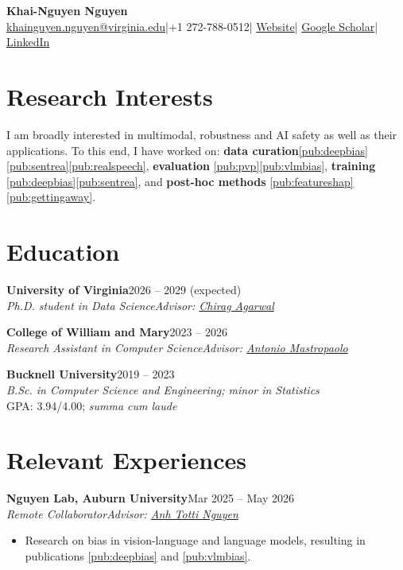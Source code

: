 \documentclass[11pt,a4paper]{article}
\newcommand{\role}[4]{\textbf{#1}\hfill #2\\\textit{#3}\hfill\textit{#4}\par}
\begin{document}
\begin{center}
{\fontsize{23}{23}\selectfont\textbf{Khai-Nguyen Nguyen}}\\[4pt]
\href{mailto:khainguyen.nguyen@virginia.edu}{khainguyen.nguyen@virginia.edu}\enspace|\enspace +1 272-788-0512\enspace|\enspace
\href{https://nkn002.github.io}{Website}\enspace|\enspace
\href{https://scholar.google.com/citations?user=WRiVlZsAAAAJ}{Google Scholar}\enspace|\enspace
\href{https://www.linkedin.com/in/nkn002/}{LinkedIn}
\end{center}

\section{Research Interests}
I am broadly interested in multimodal, robustness and AI safety as well as their applications. To this end, I have worked on: \textbf{data curation}\ref{pub:deepbias}\ref{pub:sentrea}\ref{pub:realspeech}, \textbf{evaluation} \ref{pub:pvp}\ref{pub:vlmbias}, \textbf{training} \ref{pub:deepbias}\ref{pub:sentrea}, and \textbf{post-hoc methods} \ref{pub:featureshap}\ref{pub:gettingaway}.



\section{Education}
\role{University of Virginia}{2026 -- 2029 (expected)}{Ph.D. student in Data Science}{Advisor: \href{https://scholar.google.com/citations?user=AFEjd1QAAAAJ&hl=en}{Chirag Agarwal}}
\vspace{3pt}
\role{College of William and Mary}{2023 -- 2026}{Research Assistant in Computer Science}{Advisor: \href{https://scholar.google.com/citations?user=A6E30JkAAAAJ&hl=en}{Antonio Mastropaolo}}
\vspace{3pt}
\textbf{Bucknell University}\hfill 2019 -- 2023\\
\textit{B.Sc. in Computer Science and Engineering; minor in Statistics}\\
GPA: 3.94/4.00; \textit{summa cum laude}

\section{Relevant Experiences}
\role{Nguyen Lab, Auburn University}{Mar 2025 -- May 2026}{Remote Collaborator}{Advisor: \href{https://scholar.google.com/citations?user=EQw8d9AAAAAJ&hl=en}{Anh Totti Nguyen}}
\vspace{-5pt}
\begin{itemize}
\item Research on bias in vision-language and language models, resulting in publications \ref{pub:deepbias} and \ref{pub:vlmbias}.
\end{itemize}
\end{document}

